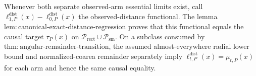 Whenever both separate observed-arm essential limits exist, call \(\ell^{\mathrm{dist}}_{1,P}(x)-\ell^{\mathrm{dist}}_{0,P}(x)\) the observed-distance functional.  The lemma \(\mathrm{lem:canonical\text{-}exact\text{-}distance\text{-}regression}\) proves that this functional equals the causal target \(\tau_P(x)\) on \(\mathcal P_{\mathrm{rect}}\cup\mathcal P_{\mathrm{sm}}\).  On a subclass consumed by \(\mathrm{thm:angular\text{-}remainder\text{-}transition}\), the assumed almost-everywhere radial lower bound and normalized-coarea remainder separately imply \(\ell^{\mathrm{dist}}_{t,P}(x)=\mu_{t,P}(x)\) for each arm and hence the same causal equality.